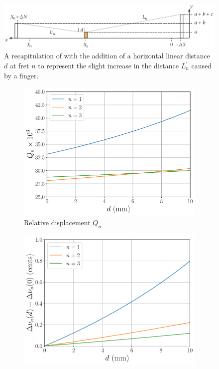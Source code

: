  \begin{figure}
  \centering
  \includegraphics[width=6.0in]{../figures/fretting_schematic}
  \caption{\label{fig:fretting_schematic} A recapitulation of  with the addition of a horizontal linear distance $d$ at fret $n$ to represent the slight increase in the distance $L_n^\prime$ caused by a finger.}
 \end{figure}

 \begin{figure}
  \centering
  \begin{subfigure}[b]{0.8\textwidth}
   \centering
   \includegraphics[width=5.0in]{../figures/fret_disp}
   \caption{Relative displacement $Q_n$}
   \label{fig:fret_disp}
  \end{subfigure}
  \par\vspace{0.25in}
  \begin{subfigure}[b]{0.8\textwidth}
   \centering
   \includegraphics[width=5.0in]{../figures/fret_shift}

\end{subfigure}
\end{figure}
